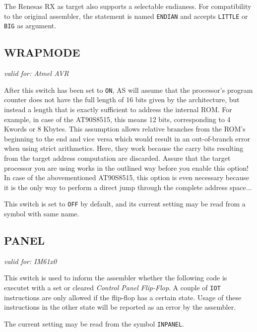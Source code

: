 \documentclass[12pt,twoside]{report}
\makeatletter
\newcommand{\tty}[1]{{\tt #1}}
\newcommand{\ttindex}[1]{\index{#1@{\tt #1}}}
\newcommand{\asname}{{AS}}
\makeatother
\begin{document}
The Renesas RX as target also supports a selectable endianess.  For
compatibility to the original assembler, the statement is named \tty{ENDIAN}
and accepts \tty{LITTLE} or \tty{BIG} as argument.


\subsection{WRAPMODE}
\ttindex{WRAPMODE}

{\em valid for: Atmel AVR}

After this switch has been set to {\tt ON}, \asname{} will assume that the
processor's program counter does not have the full length of 16 bits given
by the architecture, but instead a length that is exactly sufficient to
address the internal ROM.  For example, in case of the AT90S8515, this
means 12 bits, corresponding to 4 Kwords or 8 Kbytes.  This assumption
allows relative branches from the ROM's beginning to the end and vice
versa which would result in an out-of-branch error when using strict
arithmetics.  Here, they work because the carry bits resulting from the
target address computation are discarded.  Assure that the target
processor you are using works in the outlined way before you enable this
option!  In case of the abovementioned AT90S8515, this option is even
necessary because it is the only way to perform a direct jump through
the complete address space...

This switch is set to {\tt OFF} by default, and its current setting may be
read from a symbol with same name.


\subsection{PANEL}
\ttindex{PANEL}

{\em valid for: IM61x0}

This switch is used to inform the assembler whether the following code is
executet with a set or cleared {\em Control Panel Flip-Flop}.  A couple
of {\tt IOT} instructions are only allowed if the flip-flop has a certain
state.  Usage of these instructions in the other state will be reported
as an error by the assembler.

The current setting may be read from the symbol {\tt INPANEL}.
\end{document}
